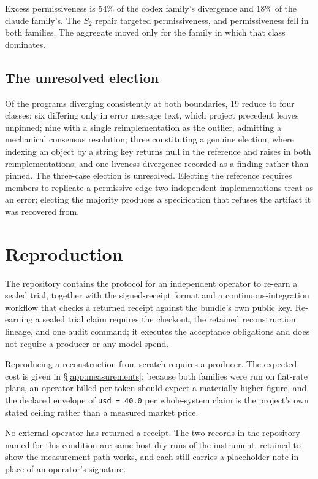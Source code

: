 Excess permissiveness is 54\% of the codex family's divergence and 18\%
of the claude family's. The $S_2$ repair targeted permissiveness, and
permissiveness fell in both families. The aggregate moved only for the
family in which that class dominates.

\subsection{The unresolved election}

Of the programs diverging consistently at both boundaries, 19 reduce to
four classes: six differing only in error message text, which project
precedent leaves unpinned; nine with a single reimplementation as the
outlier, admitting a mechanical consensus resolution; three constituting
a genuine election, where indexing an object by a string key returns null
in the reference and raises in both reimplementations; and one liveness
divergence recorded as a finding rather than pinned. The three-case
election is unresolved. Electing the reference requires members to
replicate a permissive edge two independent implementations treat as an
error; electing the majority produces a specification that refuses the
artifact it was recovered from.

\section{Reproduction}
\label{app:repro}

The repository contains the protocol for an independent operator to
re-earn a sealed trial, together with the signed-receipt format and a
continuous-integration workflow that checks a returned receipt against
the bundle's own public key. Re-earning a sealed trial claim requires the
checkout, the retained reconstruction lineage, and one audit command; it
executes the acceptance obligations and does not require a producer or
any model spend.

Reproducing a reconstruction from scratch requires a producer. The
expected cost is given in \S\ref{app:measurements}; because both families
were run on flat-rate plans, an operator billed per token should expect a
materially higher figure, and the declared envelope of \texttt{usd =
40.0} per whole-system claim is the project's own stated ceiling rather
than a measured market price.

No external operator has returned a receipt. The two records in the
repository named for this condition are same-host dry runs of the
instrument, retained to show the measurement path works, and each still
carries a placeholder note in place of an operator's signature.

\twocolumn

